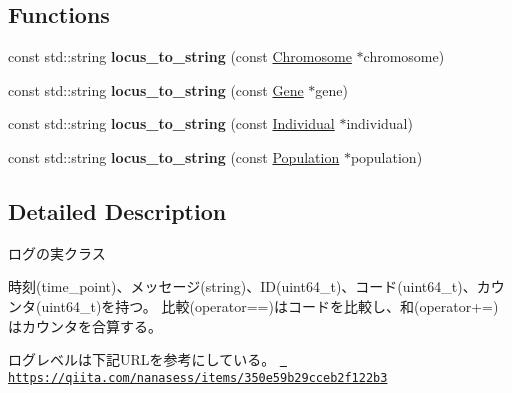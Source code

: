 \subsection*{Functions}
\begin{DoxyCompactItemize}
\item 
\mbox{\label{namespace_g_a_a3257264d9480e9ae601d4a09f7456c1e}} 
const std\+::string {\bfseries locus\+\_\+to\+\_\+string} (const \mbox{\hyperlink{class_g_a_1_1_chromosome}{Chromosome}} $\ast$chromosome)
\item 
\mbox{\label{namespace_g_a_afa6676deab617ba7f44ca7f4d1216429}} 
const std\+::string {\bfseries locus\+\_\+to\+\_\+string} (const \mbox{\hyperlink{class_g_a_1_1_gene}{Gene}} $\ast$gene)
\item 
\mbox{\label{namespace_g_a_acb12729d562fa5f52323dbccc037fa90}} 
const std\+::string {\bfseries locus\+\_\+to\+\_\+string} (const \mbox{\hyperlink{class_g_a_1_1_individual}{Individual}} $\ast$individual)
\item 
\mbox{\label{namespace_g_a_a1ecc9cbb7b0a197eb33af3792d11e77e}} 
const std\+::string {\bfseries locus\+\_\+to\+\_\+string} (const \mbox{\hyperlink{class_g_a_1_1_population}{Population}} $\ast$population)
\end{DoxyCompactItemize}


\subsection{Detailed Description}
ログの実クラス 

時刻(time\+\_\+point)、メッセージ(string)、\+I\+D(uint64\+\_\+t)、コード(uint64\+\_\+t)、カウンタ(uint64\+\_\+t)を持つ。 比較(operator==)はコードを比較し、和(operator+=)はカウンタを合算する。

ログレベルは下記\+U\+R\+Lを参考にしている。 \href{https://qiita.com/nanasess/items/350e59b29cceb2f122b3}{\texttt{ https\+://qiita.\+com/nanasess/items/350e59b29cceb2f122b3}} 